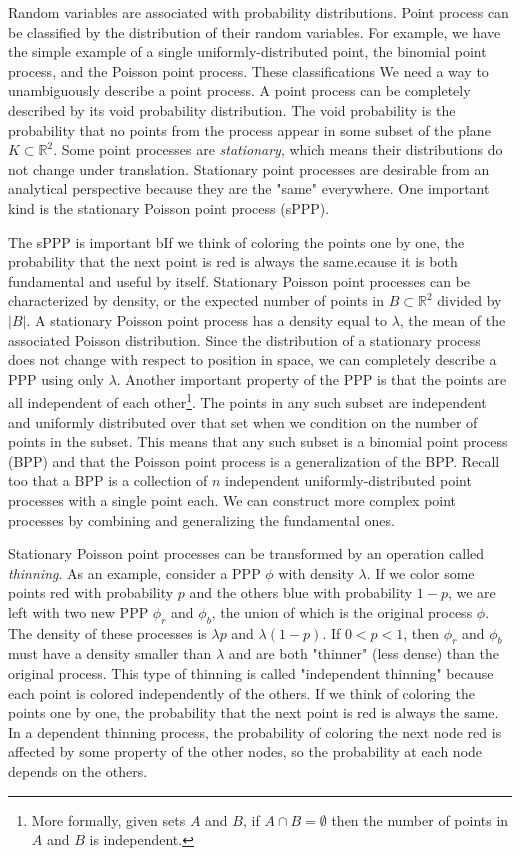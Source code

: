 \documentclass[]{article}
\begin{document}
Random variables are associated with probability distributions. Point process can be classified by the distribution of their random variables. For example, we have the simple example of a single uniformly-distributed point, the binomial point process, and the Poisson point process. These classifications We need a way to unambiguously describe a point process. A point process can be completely described by its void probability distribution. The void probability is the probability that no points from the process appear in some subset of the plane $K \subset \mathbb{R}^2$.
Some point processes are \textit{stationary}, which means their distributions do not change under translation.
Stationary point processes are desirable from an analytical perspective because they are the "same" everywhere. One important kind is the stationary Poisson point process (sPPP).

The sPPP is important bIf we think of coloring the points one by one, the probability that the next point is red is always the same.ecause it is both fundamental and useful by itself. Stationary Poisson point processes can be characterized by density, or the expected number of points in $B \subset \mathbb{R}^2$ divided by $|B|$. A stationary Poisson point process has a density equal to $\lambda$, the mean of the associated Poisson distribution. Since the distribution of a stationary process does not change with respect to position in space, we can completely describe a PPP using only $\lambda$. Another important property of the PPP is that the points are all independent of each other\footnote{More formally, given sets $A$ and $B$, if $A \cap B = \emptyset$ then the number of points in $A$ and $B$ is independent.}. The points in any such subset are independent and uniformly distributed over that set when we condition on the number of points in the subset. This means that any such subset is a binomial point process (BPP) and that the Poisson point process is a generalization of the BPP. Recall too that a BPP is a collection of $n$ independent uniformly-distributed point processes with a single point each. We can construct more complex point processes by combining and generalizing the fundamental ones.

Stationary Poisson point processes can be transformed by an operation called \textit{thinning}. As an example, consider a PPP $\phi$ with density $\lambda$. If we color some points red with probability $p$ and the others blue with probability $1-p$, we are left with two new PPP $\phi_r$ and $\phi_b$, the union of which is the original process $\phi$. The density of these processes is $\lambda p$ and $\lambda (1-p)$.
If $0 < p < 1$, then $\phi_r$ and $\phi_b$ must have a density smaller than $\lambda$ and are both "thinner" (less dense) than the original process. This type of thinning is called "independent thinning" because each point is colored independently of the others. If we think of coloring the points one by one, the probability that the next point is red is always the same. In a dependent thinning process, the probability of coloring the next node red is affected by some property of the other nodes, so the probability at each node depends on the others.
\end{document}
